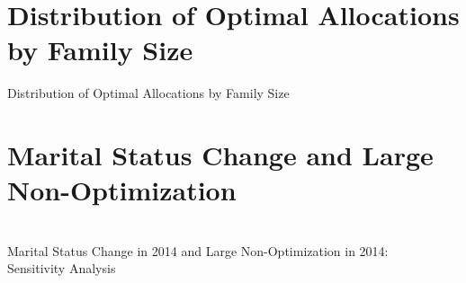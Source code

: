 \begin{subappendices}
  \section{Distribution of Optimal Allocations by Family Size}
  \begin{table}[H]
    \caption{Distribution of Optimal Allocations by Family Size}
    \label{tab:A2}

  \end{table}
\section{Marital Status Change and Large Non-Optimization}
  \begin{table}[H]
  \caption{\\Marital Status Change in 2014 and Large 
Non-Optimization in 2014:\\ Sensitivity Analysis
}
  \label{tab:A3}
  \end{table}
\end{subappendices}
\ifx\isEmbedded\undefined
\newpage
%

\else \fi